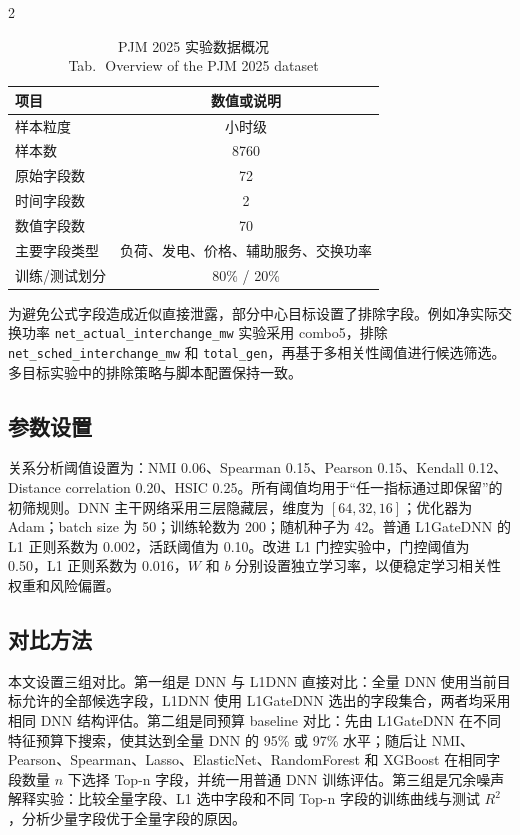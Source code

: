 \documentclass[UTF8,zihao=5,twoside]{ctexart}
\numberwithin{equation}{section}
\newcommand{\tabbicaption}[2]{%
  \caption{#1\\[-0.2em]\small Tab.\,\thetable\ #2}
}
\newcommand{\code}[1]{\texttt{#1}}
\begin{document}
\begin{multicols}{2}
\begin{table}[H]
\centering
\tabbicaption{PJM 2025 实验数据概况}{Overview of the PJM 2025 dataset}
\label{tab:data_overview}
\begin{tabular}{lc}
\toprule
项目 & 数值或说明 \\
\midrule
样本粒度 & 小时级 \\
样本数 & 8760 \\
原始字段数 & 72 \\
时间字段数 & 2 \\
数值字段数 & 70 \\
主要字段类型 & 负荷、发电、价格、辅助服务、交换功率 \\
训练/测试划分 & 80\% / 20\% \\
\bottomrule
\end{tabular}
\end{table}

为避免公式字段造成近似直接泄露，部分中心目标设置了排除字段。例如净实际交换功率 \code{net\_actual\_interchange\_mw} 实验采用 combo5，排除 \code{net\_sched\_interchange\_mw} 和 \code{total\_gen}，再基于多相关性阈值进行候选筛选。多目标实验中的排除策略与脚本配置保持一致。

\subsection{参数设置}
关系分析阈值设置为：NMI 0.06、Spearman 0.15、Pearson 0.15、Kendall 0.12、Distance correlation 0.20、HSIC 0.25。所有阈值均用于“任一指标通过即保留”的初筛规则。DNN 主干网络采用三层隐藏层，维度为 $[64,32,16]$；优化器为 Adam；batch size 为 50；训练轮数为 200；随机种子为 42。普通 L1GateDNN 的 L1 正则系数为 0.002，活跃阈值为 0.10。改进 L1 门控实验中，门控阈值为 0.50，L1 正则系数为 0.016，$W$ 和 $b$ 分别设置独立学习率，以便稳定学习相关性权重和风险偏置。

\subsection{对比方法}
本文设置三组对比。第一组是 DNN 与 L1DNN 直接对比：全量 DNN 使用当前目标允许的全部候选字段，L1DNN 使用 L1GateDNN 选出的字段集合，两者均采用相同 DNN 结构评估。第二组是同预算 baseline 对比：先由 L1GateDNN 在不同特征预算下搜索，使其达到全量 DNN 的 95\% 或 97\% 水平；随后让 NMI、Pearson、Spearman、Lasso、ElasticNet、RandomForest 和 XGBoost 在相同字段数量 $n$ 下选择 Top-n 字段，并统一用普通 DNN 训练评估。第三组是冗余噪声解释实验：比较全量字段、L1 选中字段和不同 Top-n 字段的训练曲线与测试 $R^2$，分析少量字段优于全量字段的原因。


\end{multicols}
\end{document}
